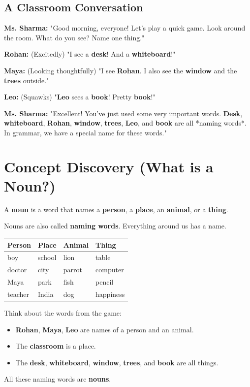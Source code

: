 \subsection*{A Classroom Conversation}
\textbf{Ms. Sharma:} "Good morning, everyone! Let's play a quick game. Look around the room. What do you see? Name one thing."

\textbf{Rohan:} (Excitedly) "I see a \textbf{desk}! And a \textbf{whiteboard}!"

\textbf{Maya:} (Looking thoughtfully) "I see \textbf{Rohan}. I also see the \textbf{window} and the \textbf{trees} outside."

\textbf{Leo:} (Squawks) "\textbf{Leo} sees a \textbf{book}! Pretty \textbf{book}!"

\textbf{Ms. Sharma:} "Excellent! You've just used some very important words. \textbf{Desk}, \textbf{whiteboard}, \textbf{Rohan}, \textbf{window}, \textbf{trees}, \textbf{Leo}, and \textbf{book} are all *naming words*. In grammar, we have a special name for these words."

\section{Concept Discovery (What is a Noun?)}
A \textbf{noun} is a word that names a \textbf{person}, a \textbf{place}, an \textbf{animal}, or a \textbf{thing}.

Nouns are also called \textbf{naming words}. Everything around us has a name.

\begin{table}[h!]
\centering
\begin{tabular}{|l|l|l|l|}
\hline
\textbf{Person} & \textbf{Place} & \textbf{Animal} & \textbf{Thing} \\
\hline
boy & school & lion & table \\
doctor & city & parrot & computer \\
Maya & park & fish & pencil \\
teacher & India & dog & happiness \\
\hline
\end{tabular}
\end{table}

Think about the words from the game:
\begin{itemize}
    \item \textbf{Rohan}, \textbf{Maya}, \textbf{Leo} are names of a person and an animal.
    \item The \textbf{classroom} is a place.
    \item The \textbf{desk}, \textbf{whiteboard}, \textbf{window}, \textbf{trees}, and \textbf{book} are all things.
\end{itemize}
All these naming words are \textbf{nouns}.

